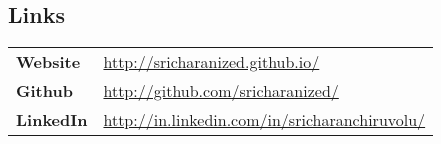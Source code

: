 \documentclass[margin]{res}
\begin{document}
\begin{resume}
\section{Links}
\begin{tabular}{l p{3.5in}}
      \bf{Website} & \hfill \underline{http://sricharanized.github.io/}\\
			\bf{Github} & \hfill  \underline{http://github.com/sricharanized/}\\
			\bf{LinkedIn} & \hfill  \underline{http://in.linkedin.com/in/sricharanchiruvolu/}\\
 \end{tabular}


\end{resume}
\end{document}
